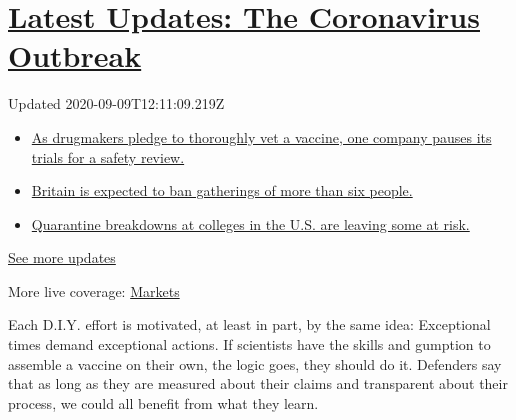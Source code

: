 \hypertarget{latest-updates-the-coronavirus-outbreak}{%
\section{\texorpdfstring{\href{https://www.nytimes3xbfgragh.onion/2020/09/09/world/covid-19-coronavirus.html?action=click\&pgtype=Article\&state=default\&region=MAIN_CONTENT_1\&context=storylines_live_updates}{Latest
Updates: The Coronavirus
Outbreak}}{Latest Updates: The Coronavirus Outbreak}}\label{latest-updates-the-coronavirus-outbreak}}

Updated 2020-09-09T12:11:09.219Z

\begin{itemize}
\tightlist
\item
  \href{https://www.nytimes3xbfgragh.onion/2020/09/09/world/covid-19-coronavirus.html?action=click\&pgtype=Article\&state=default\&region=MAIN_CONTENT_1\&context=storylines_live_updates\#link-70cea8bb}{As
  drugmakers pledge to thoroughly vet a vaccine, one company pauses its
  trials for a safety review.}
\item
  \href{https://www.nytimes3xbfgragh.onion/2020/09/09/world/covid-19-coronavirus.html?action=click\&pgtype=Article\&state=default\&region=MAIN_CONTENT_1\&context=storylines_live_updates\#link-780eaa2f}{Britain
  is expected to ban gatherings of more than six people.}
\item
  \href{https://www.nytimes3xbfgragh.onion/2020/09/09/world/covid-19-coronavirus.html?action=click\&pgtype=Article\&state=default\&region=MAIN_CONTENT_1\&context=storylines_live_updates\#link-11cec4c0}{Quarantine
  breakdowns at colleges in the U.S. are leaving some at risk.}
\end{itemize}

\href{https://www.nytimes3xbfgragh.onion/2020/09/09/world/covid-19-coronavirus.html?action=click\&pgtype=Article\&state=default\&region=MAIN_CONTENT_1\&context=storylines_live_updates}{See
more updates}

More live coverage:
\href{https://www.nytimes3xbfgragh.onion/live/2020/09/09/business/stock-market-today-coronavirus?action=click\&pgtype=Article\&state=default\&region=MAIN_CONTENT_1\&context=storylines_live_updates}{Markets}

Each D.I.Y. effort is motivated, at least in part, by the same idea:
Exceptional times demand exceptional actions. If scientists have the
skills and gumption to assemble a vaccine on their own, the logic goes,
they should do it. Defenders say that as long as they are measured about
their claims and transparent about their process, we could all benefit
from what they learn.

